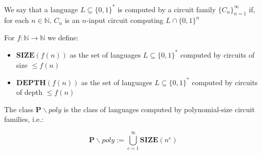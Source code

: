 \documentclass{report}
\newcommand{\N}{\mathbb{N}}
\begin{document}
We say that a language $L\subseteq \{ 0,1 \} ^{*}$ is computed by a circuit family $\{ C_{n} \}_{n=1}^{\infty} $ if, for each $n\in \N$, $C_{n}$ is an $n$-input circuit computing $L \cap \{ 0,1 \} ^{n}$

For $f :\N \rightarrow \N$ we define:

\begin{itemize}
  \item $\mathbf{SIZE}(f(n)) $ as the set of languages $L \subseteq \{ 0,1 \} ^{*}$ computed by circuits of size $\leq f(n)$

  \item $\mathbf{DEPTH} (f(n))$ as the set of languages $L\subseteq \{ 0,1 \} ^{*}$ computed by circuits of depth $\leq f(n)$
\end{itemize}

The class $\mathbf{P} \backslash poly$ is the class of languages computed by polynomial-size circuit families, i.e.:

\[
  \mathbf{P} \backslash poly := \bigcup_{c=1}^{\infty} \mathbf{SIZE}(n^{c})
\]
\end{document}
